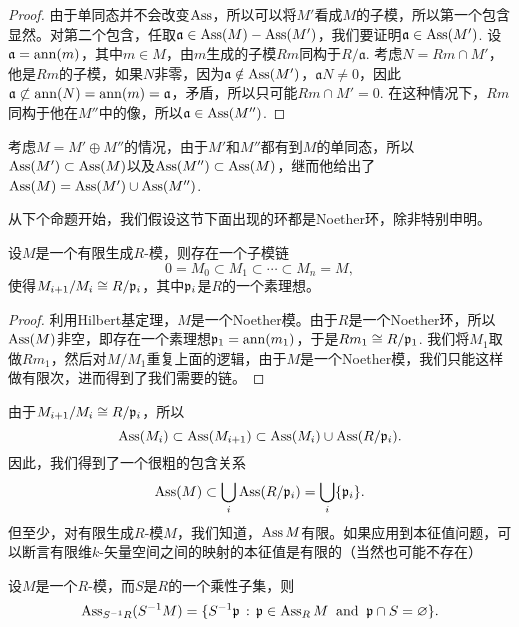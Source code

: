 \begin{proof}
	由于单同态并不会改变$\operatorname{Ass}$，所以可以将$M'$看成$M$的子模，所以第一个包含显然。对第二个包含，任取$\mathfrak{a}\in \operatorname{Ass}(M)-\operatorname{Ass}(M')$，我们要证明$\mathfrak{a}\in \operatorname{Ass}(M')$. 设$\mathfrak{a}=\operatorname{ann}(m)$，其中$m\in M$，由$m$生成的子模$Rm$同构于$R/\mathfrak{a}$. 考虑$N=Rm\cap M'$，他是$Rm$的子模，如果$N$非零，因为$\mathfrak{a}\notin \operatorname{Ass}(M')$，$\mathfrak{a}N\neq 0$，因此$\mathfrak{a}\not\subset \operatorname{ann}(N)=\operatorname{ann}(m)=\mathfrak{a}$，矛盾，所以只可能$Rm\cap M'=0$. 在这种情况下，$Rm$同构于他在$M''$中的像，所以$\mathfrak{a}\in \operatorname{Ass}(M'')$.
\end{proof}

考虑$M=M'\oplus M''$的情况，由于$M'$和$M''$都有到$M$的单同态，所以$\operatorname{Ass}(M')\subset \operatorname{Ass}(M)$以及$\operatorname{Ass}(M'')\subset \operatorname{Ass}(M)$，继而他给出了$\operatorname{Ass}(M)=\operatorname{Ass}(M')\cup \operatorname{Ass}(M'')$.

从下个命题开始，我们假设这节下面出现的环都是Noether环，除非特别申明。

\begin{pro}
设$M$是一个有限生成$R$-模，则存在一个子模链
\[
	0=M_0\subset M_1\subset \cdots\subset M_n=M,
\]
使得$M_{i+1}/M_i\cong R/\mathfrak{p}_i$，其中$\mathfrak{p}_i$是$R$的一个素理想。
\end{pro}

\begin{proof}
利用Hilbert基定理，$M$是一个Noether模。由于$R$是一个Noether环，所以$\operatorname{Ass}(M)$非空，即存在一个素理想$\mathfrak{p}_1=\operatorname{ann}(m_1)$，于是$Rm_1\cong R/\mathfrak{p}_1$. 我们将$M_1$取做$Rm_1$，然后对$M/M_1$重复上面的逻辑，由于$M$是一个Noether模，我们只能这样做有限次，进而得到了我们需要的链。
\end{proof}

由于$M_{i+1}/M_i\cong R/\mathfrak{p}_i$，所以
\[
	\operatorname{Ass}(M_i)\subset \operatorname{Ass}(M_{i+1})\subset \operatorname{Ass}(M_i)\cup \operatorname{Ass}(R/\mathfrak{p}_i).
\]
因此，我们得到了一个很粗的包含关系
\[
	\operatorname{Ass}(M)\subset \bigcup_i \operatorname{Ass}(R/\mathfrak{p}_i)=\bigcup_i \{\mathfrak{p}_i\}.
\]
但至少，对有限生成$R$-模$M$，我们知道，$\operatorname{Ass} M$有限。如果应用到本征值问题，可以断言有限维$k$-矢量空间之间的映射的本征值是有限的（当然也可能不存在）

\begin{pro}
设$M$是一个$R$-模，而$S$是$R$的一个乘性子集，则
\[
	\operatorname{Ass}_{S^{-1}R}(S^{-1}M)=\{S^{-1}\mathfrak{p}\,:\,\mathfrak{p}\in \operatorname{Ass}_RM\;\;\text{and}\;\;\mathfrak p\cap S=\varnothing\}.
\]
\end{pro}

